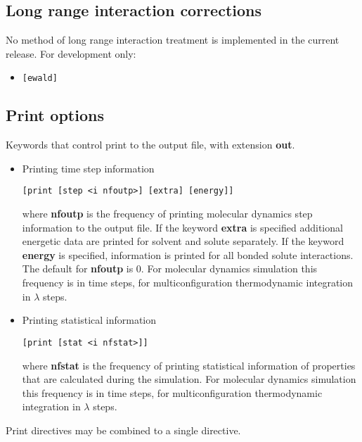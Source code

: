 \subsection{Long range interaction corrections}
No method of long range interaction treatment is implemented in the
current release. For development only:
\begin{itemize}
\item
\begin{verbatim}
[ewald]
\end{verbatim}
\end{itemize}
\subsection{Print options}
Keywords that control print to the output file, with extension {\bf out}.
\begin{itemize}
\item
Printing time step information
\begin{verbatim}
[print [step <i nfoutp>] [extra] [energy]]
\end{verbatim}
where {\bf nfoutp} is the frequency of printing molecular dynamics step
information to the output file. If the keyword {\bf extra} is specified
additional energetic data are printed for solvent and solute separately.
If the keyword {\bf energy} is specified, information is printed for
all bonded solute interactions.
The default for {\bf nfoutp} is 0. For molecular dynamics simulation
this frequency is in time steps, for multiconfiguration thermodynamic
integration in $\lambda$ steps.
\item
Printing statistical information
\begin{verbatim}
[print [stat <i nfstat>]]
\end{verbatim}
where {\bf nfstat} is the frequency of printing statistical information
of properties that are calculated during the simulation. 
For molecular dynamics simulation
this frequency is in time steps, for multiconfiguration thermodynamic
integration in $\lambda$ steps.
\end{itemize}
Print directives may be combined to a single directive.
